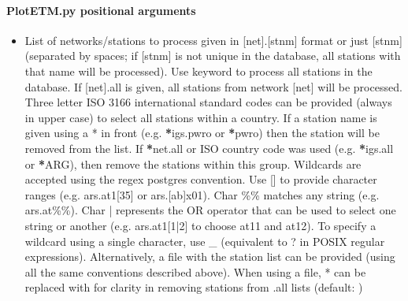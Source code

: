 \documentclass[letterpaper,10pt,english]{sphinxmanual}
\begin{document}
\paragraph{PlotETM.py positional arguments}
\label{\detokenize{com:PlotETM.py-positional-arguments}}\begin{itemize}
\item {} 
\sphinxAtStartPar
{\hyperref[\detokenize{com:PlotETM.py-stnlist}]{}} \sphinxhyphen{} List of networks/stations to process given in {[}net{]}.{[}stnm{]} format or just {[}stnm{]} (separated by spaces; if {[}stnm{]} is not unique in the database, all stations with that name will be processed). Use keyword  to process all stations in the database. If {[}net{]}.all is given, all stations from network {[}net{]} will be processed. Three letter ISO 3166 international standard codes can be provided (always in upper case) to select all stations within a country. If a station name is given using a * in front (e.g. {\color{red}\bfseries{}*}igs.pwro or {\color{red}\bfseries{}*}pwro) then the station will be removed from the list. If {\color{red}\bfseries{}*}net.all or ISO country code was used (e.g. {\color{red}\bfseries{}*}igs.all or {\color{red}\bfseries{}*}ARG), then remove the stations within this group. Wildcards are accepted using the regex postgres convention. Use {[}{]} to provide character ranges (e.g. ars.at1{[}3\sphinxhyphen{}5{]} or ars.{[}a\sphinxhyphen{}b{]}x01). Char \%\% matches any string (e.g. ars.at\%\%). Char | represents the OR operator that can be used to select one string or another (e.g. ars.at1{[}1|2{]} to choose at11 and at12). To specify a wildcard using a single character, use \_ (equivalent to ? in POSIX regular expressions). Alternatively, a file with the station list can be provided (using all the same conventions described above). When using a file, * can be replaced with \sphinxhyphen{} for clarity in removing stations from .all lists (default: )

\end{itemize}
\end{document}
